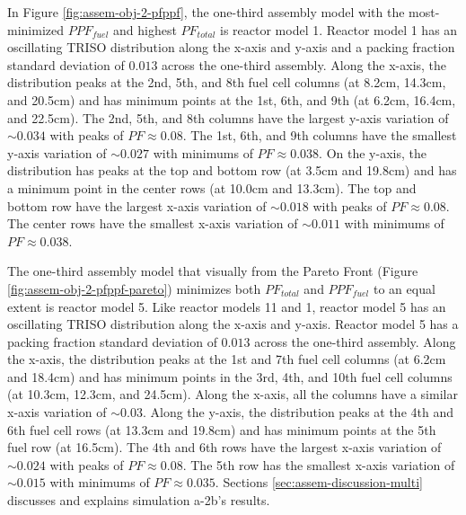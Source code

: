 In Figure \ref{fig:assem-obj-2-pfppf}, the one-third assembly model with 
the most-minimized $PPF_{fuel}$ and highest $PF_{total}$ is reactor model 1.
Reactor model 1 has an oscillating TRISO distribution along the 
x-axis and y-axis and a packing fraction standard deviation of $0.013$ across the 
one-third assembly.
Along the x-axis, the distribution peaks at the 2nd, 5th, and 8th fuel cell columns (at 
8.2cm, 14.3cm, and 20.5cm) and has minimum points at the 1st, 6th, and 9th (at 6.2cm, 
16.4cm, and 22.5cm).
The 2nd, 5th, and 8th columns have the largest y-axis variation of ${\sim}0.034$ with 
peaks of $PF\approx0.08$.
The 1st, 6th, and 9th columns have the smallest y-axis variation of ${\sim}0.027$ with 
minimums of $PF\approx0.038$. 
On the y-axis, the distribution has peaks at the top and bottom row (at 3.5cm and 
19.8cm) and has a minimum point in the center rows (at 10.0cm and 13.3cm).
The top and bottom row have the largest x-axis variation of ${\sim}0.018$ with 
peaks of $PF\approx0.08$.
The center rows have the smallest x-axis variation of ${\sim}0.011$ with minimums 
of $PF\approx0.038$. 

The one-third assembly model that visually from the Pareto Front (Figure 
\ref{fig:assem-obj-2-pfppf-pareto}) minimizes both $PF_{total}$ and $PPF_{fuel}$ 
to an equal extent is reactor model 5. 
Like reactor models 11 and 1, reactor model 5 has an oscillating TRISO 
distribution along the x-axis and y-axis. 
Reactor model 5 has a packing fraction standard deviation of $0.013$ across the 
one-third assembly.
Along the x-axis, the distribution peaks at the 1st and 7th fuel cell columns 
(at 6.2cm and 18.4cm) and has minimum points in the 3rd, 4th, and 10th fuel cell 
columns (at 10.3cm, 12.3cm, and 24.5cm).
Along the x-axis, all the columns have a similar x-axis variation of ${\sim}0.03$.
Along the y-axis, the distribution peaks at the 4th and 6th fuel cell rows (at 13.3cm 
and 19.8cm) and has minimum points at the 5th fuel row (at 16.5cm). 
The 4th and 6th rows have the largest x-axis variation of ${\sim}0.024$ with peaks of 
$PF\approx0.08$. 
The 5th row has the smallest x-axis variation of ${\sim}0.015$ with minimums of 
$PF\approx0.035$. 
Sections \ref{sec:assem-discussion-multi} discusses and explains simulation a-2b's 
results.


